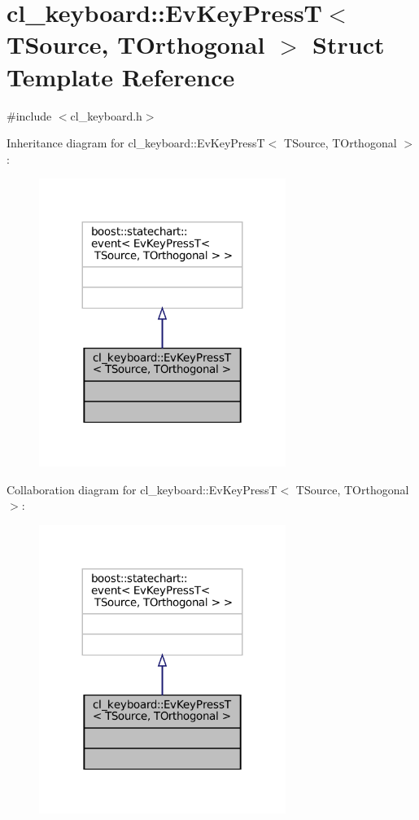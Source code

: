 \hypertarget{structcl__keyboard_1_1EvKeyPressT}{}\section{cl\+\_\+keyboard\+:\+:Ev\+Key\+PressT$<$ T\+Source, T\+Orthogonal $>$ Struct Template Reference}
\label{structcl__keyboard_1_1EvKeyPressT}


{\ttfamily \#include $<$cl\+\_\+keyboard.\+h$>$}



Inheritance diagram for cl\+\_\+keyboard\+:\+:Ev\+Key\+PressT$<$ T\+Source, T\+Orthogonal $>$\+:
\nopagebreak
\begin{figure}[H]
\begin{center}
\leavevmode
\includegraphics[width=227pt]{structcl__keyboard_1_1EvKeyPressT__inherit__graph}
\end{center}
\end{figure}


Collaboration diagram for cl\+\_\+keyboard\+:\+:Ev\+Key\+PressT$<$ T\+Source, T\+Orthogonal $>$\+:
\nopagebreak
\begin{figure}[H]
\begin{center}
\leavevmode
\includegraphics[width=227pt]{structcl__keyboard_1_1EvKeyPressT__coll__graph}
\end{center}
\end{figure}


